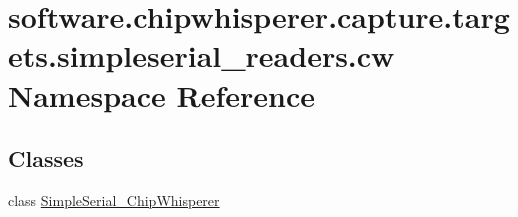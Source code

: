 \hypertarget{namespacesoftware_1_1chipwhisperer_1_1capture_1_1targets_1_1simpleserial__readers_1_1cw}{}\section{software.\+chipwhisperer.\+capture.\+targets.\+simpleserial\+\_\+readers.\+cw Namespace Reference}
\label{namespacesoftware_1_1chipwhisperer_1_1capture_1_1targets_1_1simpleserial__readers_1_1cw}
\subsection*{Classes}
\begin{DoxyCompactItemize}
\item 
class \hyperlink{classsoftware_1_1chipwhisperer_1_1capture_1_1targets_1_1simpleserial__readers_1_1cw_1_1SimpleSerial__ChipWhisperer}{Simple\+Serial\+\_\+\+Chip\+Whisperer}
\end{DoxyCompactItemize}
